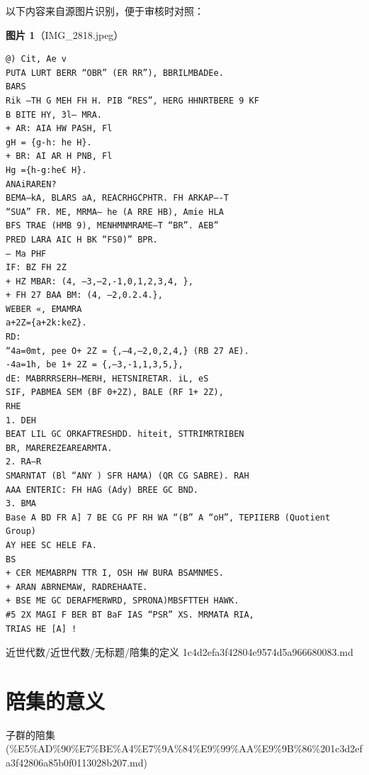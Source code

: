 \begin{note}
以下内容来自源图片识别，便于审核时对照：

\textbf{图片 1}（IMG\_2818.jpeg）
\begin{Verbatim}[fontsize=\small]
@) Cit, Ae v
PUTA LURT BERR “OBR” (ER RR”), BBRILMBADEe.
BARS
Rik —TH G MEH FH H. PIB “RES”, HERG HHNRTBERE 9 KF
B BITE HY, 3l— MRA.
+ AR: AIA HW PASH, Fl
gH = {g-h: he H}.
+ BR: AI AR H PNB, Fl
Hg ={h-g:he€ H}.
ANAiRAREN?
BEMA—kA, BLARS aA, REACRHGCPHTR. FH ARKAP—-T
“SUA” FR. ME, MRMA— he (A RRE HB), Amie HLA
BFS TRAE (HMB 9), MENHMNMRAME—T “BR”. AEB”
PRED LARA AIC H BK “FS0)” BPR.
— Ma PHF
IF: BZ FH 2Z
+ HZ MBAR: (4, —3,—2,-1,0,1,2,3,4, },
+ FH 27 BAA BM: (4, —2,0.2.4.},
WEBER «, EMAMRA
a+2Z={a+2k:keZ}.
RD:
“4a=0mt, pee O+ 2Z = {,—4,—2,0,2,4,} (RB 27 AE).
-4a=1h, be 1+ 2Z = {,—3,-1,1,3,5,},
dE: MABRRRSERH—MERH, HETSNIRETAR. iL, eS
SIF, PABMEA SEM (BF 0+2Z), BALE (RF 1+ 2Z),
RHE
1. DEH
BEAT LIL GC ORKAFTRESHDD. hiteit, STTRIMRTRIBEN
BR, MAREREZEAREARMTA.
2. RA—R
SMARNTAT (Bl “ANY ) SFR HAMA) (QR CG SABRE). RAH
AAA ENTERIC: FH HAG (Ady) BREE GC BND.
3. BMA
Base A BD FR A] 7 BE CG PF RH WA “(B” A “oH”, TEPIIERB (Quotient Group)
AY HEE SC HELE FA.
BS
+ CER MEMABRPN TTR I, OSH HW BURA BSAMNMES.
+ ARAN ABRNEMAW, RADREHAATE.
+ BSE ME GC DERAFMERWRD, SPRONA)MBSFTTEH HAWK.
#5 2X MAGI F BER BT BaF IAS “PSR” XS. MRMATA RIA,
TRIAS HE [A] !
\end{Verbatim}

\end{note}

\begin{note}[来源路径]

近世代数/近世代数/无标题/陪集的定义 1c4d2efa3f42804e9574d5a966680083.md

\end{note}

\section*{陪集的意义}

\begin{note}[来源上级主题]

子群的陪集 (\%E5\%AD\%90\%E7\%BE\%A4\%E7\%9A\%84\%E9\%99\%AA\%E9\%9B\%86\%201c3d2efa3f42806a85b0f0113028b207.md)

\end{note}

